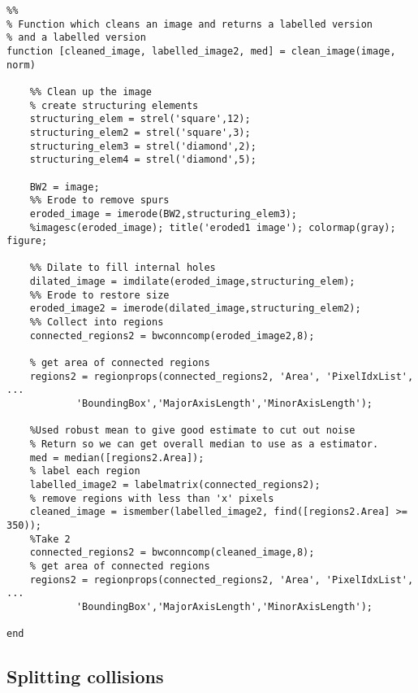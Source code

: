 \documentclass{article}
\begin{document}
\begin{lstlisting}
%%
% Function which cleans an image and returns a labelled version
% and a labelled version
function [cleaned_image, labelled_image2, med] = clean_image(image, norm)

    %% Clean up the image
    % create structuring elements
    structuring_elem = strel('square',12);
    structuring_elem2 = strel('square',3);
    structuring_elem3 = strel('diamond',2);
    structuring_elem4 = strel('diamond',5);
    
    BW2 = image;
    %% Erode to remove spurs
    eroded_image = imerode(BW2,structuring_elem3);
    %imagesc(eroded_image); title('eroded1 image'); colormap(gray); figure;

    %% Dilate to fill internal holes
    dilated_image = imdilate(eroded_image,structuring_elem);
    %% Erode to restore size
    eroded_image2 = imerode(dilated_image,structuring_elem2);
    %% Collect into regions
    connected_regions2 = bwconncomp(eroded_image2,8);
    
    % get area of connected regions
    regions2 = regionprops(connected_regions2, 'Area', 'PixelIdxList', ...
            'BoundingBox','MajorAxisLength','MinorAxisLength');
            
    %Used robust mean to give good estimate to cut out noise
    % Return so we can get overall median to use as a estimator.
    med = median([regions2.Area]);
    % label each region
    labelled_image2 = labelmatrix(connected_regions2);
    % remove regions with less than 'x' pixels
    cleaned_image = ismember(labelled_image2, find([regions2.Area] >= 350));
    %Take 2
    connected_regions2 = bwconncomp(cleaned_image,8);
    % get area of connected regions
    regions2 = regionprops(connected_regions2, 'Area', 'PixelIdxList', ...
            'BoundingBox','MajorAxisLength','MinorAxisLength');

end
\end{lstlisting}

\subsection{Splitting collisions}

\end{document}
